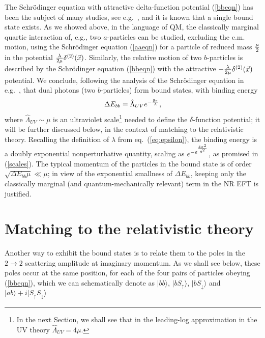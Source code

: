 \documentclass[11pt]{article}
\begin{document}
The Schr\" odinger equation with  attractive delta-function potential (\ref{bbeqn}) has been the subject of many studies, see e.g.~\cite{Jackiw:1991je,Kaplan:2005es}, and it is known that a single bound state exists.  As we showed above, in the language of QM, the classically marginal quartic interaction of, e.g., two $a$-particles can be studied, excluding the c.m. motion, using the Schr\" odinger equation (\ref{aaeqn}) for a particle of reduced mass $\mu\over 2$ in the potential ${\lambda \over   2 \mu} \delta^{(2)}(\vec{x})$. Similarly, the relative motion of two $b$-particles is described by the  Schr\" odinger equation (\ref{bbeqn}) with  the attractive $-{\lambda \over 2 \mu}  \delta^{(2)}(\vec{x})$ potential.  We conclude, following the  analysis of the Schr\" odinger equation in  e.g.~\cite{Jackiw:1991je},   that dual photons (two $b$-particles) form bound states, with binding energy 
\begin{equation}
\label{Ebb}
\Delta E_{bb} =  \hat\Lambda_{UV} e^{- {8 \pi \over \lambda}},
\end{equation}
 where $\hat\Lambda_{UV} \sim \mu$ is an ultraviolet scale\footnote{In the next Section, we shall see that in the leading-log approximation in the UV theory $\hat\Lambda_{UV} = 4 \mu$. } needed to define the $\delta$-function potential; it will be further  discussed below, in the context of matching to the relativistic theory.
  Recalling the definition of $\lambda$ from  eq.~(\ref{eq:epsilon}), the binding energy is a doubly exponential nonperturbative quantity, scaling as $e^{- e^{4 \pi^2 \over g^2}}$, as promised in (\ref{scales}). The typical momentum of the particles in the bound state is of order $\sqrt{\Delta E_{bb} \mu} \ll \mu$; in view of the exponential smallness of $\Delta E_{bb}$, keeping only the classically marginal (and quantum-mechanically relevant) term in the NR EFT is justified. 
  



\section{Matching to the relativistic theory}
\label{matching}

Another way to exhibit the bound states is to relate them to 
the poles in the $2\rightarrow 2$ scattering amplitude at imaginary momentum. As we shall see below, these poles  occur at the same position, for each of the four pairs of particles obeying (\ref{bbeqn}), which we can schematically denote as $|bb\rangle$, $|bS_\uparrow\rangle$, $|bS_\downarrow\rangle$ and $|ab\rangle + i |S_\uparrow S_\downarrow\rangle$  
\end{document}
